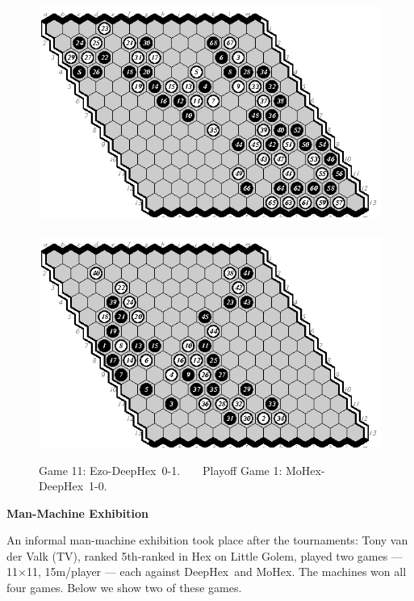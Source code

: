 \documentclass{icga}
\def\Dx{\mbox{\sc DeepHex}}
\def\Eo{\mbox{\sc Ezo}}
\def\Mx{\mbox{\sc MoHex}}
\def\TV{\mbox{\sc TV}} %
\begin{document}
\begin{figure}[hbp]
\includegraphics[scale=1.3]{13.11e-d.swap.eps}\hspace*{-2.5cm}\
\includegraphics[scale=1.3]{13.p01m-d.eps}
\caption{Game 11: \Eo-\Dx\ 0-1. ~ ~ Playoff Game 1: \Mx-\Dx\ 1-0.}
\end{figure}

\newpage
{\large\bf Man-Machine Exhibition} 

An informal man-machine exhibition took place after the tournaments:
Tony van der Valk (\TV), ranked 5th-ranked in Hex on Little Golem,
played two games --- 11$\times$11, 15m/player --- 
each against \Dx\ and \Mx. The machines won all four games.
Below we show two of these games.


\end{document}
